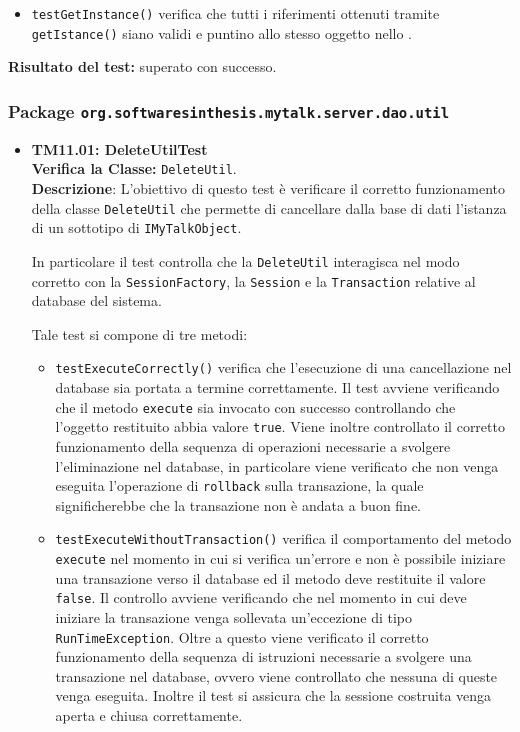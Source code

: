 \begin{itemize}
\begin{itemize}
\item \texttt{testGetInstance()} verifica che tutti i riferimenti ottenuti tramite \texttt{getIstance()} siano validi e puntino allo stesso oggetto nello .


\end{itemize}
\textbf{Risultato del test:} superato con successo.
\end{itemize}


\subsubsection{Package \texttt{org.softwaresinthesis.mytalk.server.dao.util}}
\begin{itemize}

\item \textbf{TM11.01: DeleteUtilTest}\\
\textbf{Verifica la Classe:} \texttt{DeleteUtil}.\\
\textbf{Descrizione}: L'obiettivo di questo test è verificare il corretto funzionamento della classe \texttt{DeleteUtil} che permette di cancellare dalla base di dati l'istanza di un sottotipo di \texttt{IMyTalkObject}.

In particolare il test controlla che la \texttt{DeleteUtil} interagisca nel modo corretto con la \texttt{SessionFactory}, la \texttt{Session} e la \texttt{Transaction} relative al database del sistema.

Tale test si compone di tre metodi:
\begin{itemize}
\item \texttt{testExecuteCorrectly()} verifica che l'esecuzione di una cancellazione nel database sia portata a termine correttamente. Il test avviene verificando che il metodo \texttt{execute} sia invocato con successo controllando che l'oggetto restituito abbia valore \texttt{true}. Viene inoltre controllato il corretto funzionamento della sequenza di operazioni necessarie a svolgere l'eliminazione nel database, in particolare viene verificato che non venga eseguita l'operazione di \texttt{rollback} sulla transazione, la quale significherebbe che la transazione non è andata a buon fine.

\item \texttt{testExecuteWithoutTransaction()} verifica il comportamento del metodo\\ \texttt{execute} nel momento in cui si verifica un'errore e non è possibile iniziare una transazione verso il database ed il metodo deve restituite il valore \texttt{false}. Il controllo avviene verificando che nel momento in cui deve iniziare la transazione venga sollevata un'eccezione di tipo \texttt{RunTimeException}. Oltre a questo viene verificato il corretto funzionamento della sequenza di istruzioni necessarie a svolgere una transazione nel database, ovvero viene controllato che nessuna di queste venga eseguita. Inoltre il test si assicura che la sessione costruita venga aperta e chiusa correttamente.


\end{itemize}
\end{itemize}

